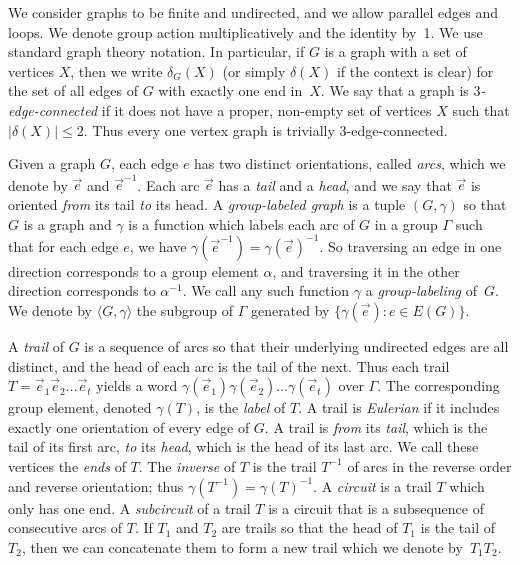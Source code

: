 \documentclass[a4paper, 12pt]{article}
\let\leq\leqslant
\newcommand{\RMM}[1]{\textcolor{orange}{RM: #1}}
\newcommand{\DK}[1]{\textcolor{blue}{DK: #1}}
\begin{document}
We consider graphs to be finite and undirected, and we allow parallel edges and loops. We denote group action multiplicatively and the identity by~1. We use standard graph theory notation. In particular, if $G$ is a graph with a set of vertices $X$, then we write $\delta_G(X)$ (or simply $\delta(X)$ if the context is clear) for the set of all edges of $G$ with exactly one end in~$X$. We say that a graph is \emph{$3$-edge-connected} if it does not have a proper, non-empty set of vertices $X$ such that $|\delta(X)|\leq 2$. Thus every one vertex graph is trivially $3$-edge-connected.


Given a graph $G$, each edge $e$ has two distinct orientations, called \emph{arcs}, which we denote by $\vec{e}$ and $\vec{e}^{-1}$. Each arc $\vec{e}$ has a \emph{tail} and a \emph{head}, and we say that $\vec{e}$ is oriented \emph{from} its tail \emph{to} its head. A \emph{group-labeled graph} is a tuple $(G, \gamma)$ so that $G$ is a graph and $\gamma$ is a function which labels each arc of $G$ in a group $\Gamma$ such that for each edge $e$, we have $\gamma(\vec{e}^{-1})=\gamma(\vec{e})^{-1}$. So traversing an edge in one direction corresponds to a group element $\alpha$, and traversing it in the other direction corresponds to $\alpha^{-1}$. We call any such function $\gamma$ a \emph{group-labeling} of~$G$. We denote by $\langle G, \gamma\rangle$ the subgroup of $\Gamma$ generated by $\{\gamma(\vec{e}) : e \in E(G)\}$. 

A \emph{trail} of $G$ is a sequence of arcs so that their underlying undirected edges are all distinct, and the head of each arc is the tail of the next. Thus each trail $T=\vec{e}_1\vec{e}_2\dots\vec{e}_t$ yields a word $\gamma(\vec{e}_1)\gamma(\vec{e}_2)\dots\gamma(\vec{e}_t)$ over $\Gamma$. The corresponding group element, denoted $\gamma(T)$, is the \emph{label} of $T$. A trail is \emph{Eulerian} if it includes exactly one orientation of every edge of $G$. A trail is \emph{from} its \emph{tail}, which is the tail of its first arc, \emph{to} its \emph{head}, which is the head of its last arc. We call these vertices the \textit{ends} of $T$. The \emph{inverse} of $T$ is the trail $T^{-1}$ of arcs in the reverse order and reverse orientation; thus $\gamma(T^{-1})=\gamma(T)^{-1}$. A \emph{circuit} is a trail $T$ which only has one end.
A \emph{subcircuit} of a trail $T$ is a circuit that is a subsequence of consecutive arcs of $T$. If $T_1$ and $T_2$ are trails so that the head of $T_1$ is the tail of $T_2$, then we can concatenate them to form a new trail which we denote by~$T_1T_2$.
\end{document}
